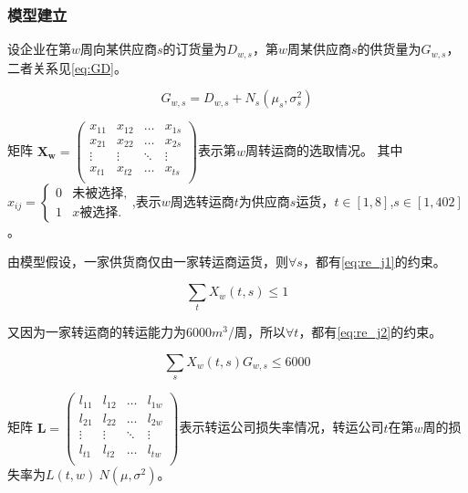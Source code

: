 \documentclass[withoutpreface,bwprint]{cumcmthesis} %
\begin{document}
\subsubsection{模型建立}

设企业在第$w$周向某供应商$s$的订货量为$D_{w,s}$，第$w$周某供应商$s$的供货量为$G_{w,s}$，二者关系见\cref{eq:GD}。

\begin{equation}
G_{w,s}=D_{w,s}+N_s(\mu_s,\sigma_s^2)
\label{eq:GD}
\end{equation}

矩阵
$
\mathbf{X_w} = \left(
    \begin{array}{cccc}
    x_{11} & x_{12} & \ldots & x_{1s}\\
    x_{21} & x_{22} & \ldots & x_{2s}\\
    \vdots & \vdots & \ddots & \vdots\\
    x_{t1} & x_{t2} & \ldots & x_{ts}\\
    \end{array} \right)
$表示第$w$周转运商的选取情况。
其中
$
x_{ij} =
    \begin{cases}
        0 &  \text{未被选择} ,\\
        1 &  x \text{被选择} .
    \end{cases}
$,表示$w$周选转运商$t$为供应商$s$运货，$t\in [1,8]$,$s\in [1,402]$。

由模型假设，一家供货商仅由一家转运商运货，则$\forall s$，都有\cref{eq:re_j1}的约束。

\begin{equation}
\sum\limits_t X_w(t,s)\le 1
\label{eq:re_j1}
\end{equation}

又因为一家转运商的转运能力为6000$m^3$/周，所以$\forall t$，都有\cref{eq:re_j2}的约束。

\begin{equation}
\sum\limits_s X_w(t,s)G_{w,s}\le 6000
\label{eq:re_j2}
\end{equation}

矩阵
$
\mathbf{L} = \left(
    \begin{array}{cccc}
    l_{11} & l_{12} & \ldots & l_{1w}\\
    l_{21} & l_{22} & \ldots & l_{2w}\\
    \vdots & \vdots & \ddots & \vdots\\
    l_{t1} & l_{t2} & \ldots & l_{tw}\\
    \end{array} \right)
$表示转运公司损失率情况，转运公司$t$在第$w$周的损失率为$L(t,w)~N(\mu,\sigma^2)$。
\end{document}
